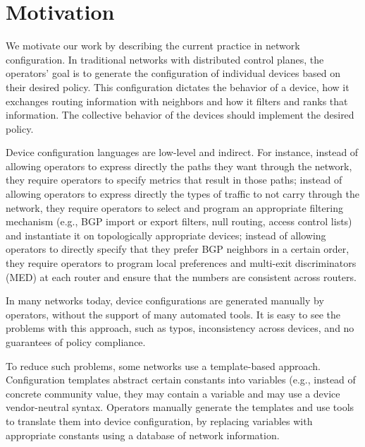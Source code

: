 \section{Motivation}
\label{sec:motivation}

We motivate our work by describing the current practice in network 
configuration. In traditional networks with distributed control planes, the operators' goal is to generate the configuration of individual devices based on their desired policy. This configuration dictates the behavior of a device, how it exchanges routing information with neighbors and how it filters and ranks that information. The collective behavior of the devices should implement the desired policy.

Device configuration languages are low-level and indirect. For instance, instead of allowing operators to express directly the paths they want through the network, they require operators to specify metrics that result in those paths; instead of allowing operators to express directly the types of traffic to not carry through the network, they require operators to select and program an appropriate filtering mechanism (e.g., BGP import or export filters, null routing,  access control lists) and instantiate it on topologically appropriate devices; instead of allowing operators to directly specify that they prefer BGP neighbors in a certain order, they require operators to program local preferences and multi-exit discriminators (MED) at each router and ensure that the numbers are consistent across routers.

In many networks today, device configurations are generated manually by operators, without the support of many automated tools. It is easy to see the problems with this approach, such as typos, inconsistency across devices, and no guarantees of policy compliance.

To reduce such problems, some networks use a template-based approach. Configuration templates abstract certain constants into variables (e.g., instead of concrete community value, they may contain a variable {\small {}} and may use a device vendor-neutral syntax. Operators manually generate the templates and use tools to translate them into device configuration, by replacing variables with appropriate constants using a database of network information.



